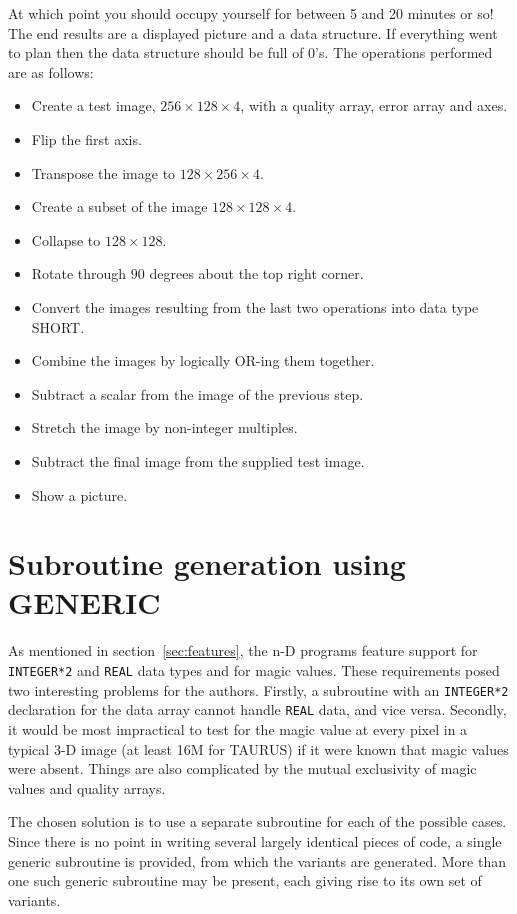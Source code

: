 At which point you should occupy yourself for between 5 and 20 minutes or 
so! The end results are a displayed picture and a data structure. 
If everything went
to plan then the data structure should be full of $0$'s. The operations 
performed are as follows:
\begin{itemize}
\item Create a test image, $256\times 128\times 4$, with a quality array, error
array and axes.
\item Flip the first axis.
\item Transpose the image to $128\times 256\times 4$.
\item Create a subset of the image $128\times 128\times 4$.
\item Collapse to $128\times 128$.
\item Rotate through $90$ degrees about the top right corner.
\item Convert the images resulting from the last two operations into data
type SHORT.
\item Combine the images by logically OR-ing them together.
\item Subtract a scalar from the image of the previous step.
\item Stretch the image by non-integer multiples.
\item Subtract the final image from the supplied test image.
\item Show a picture.
\end{itemize}

\section{Subroutine generation using GENERIC{}}
\label{sec:generic}

As mentioned in section~\ref{sec:features}, the n-D programs feature support for
{\tt INTEGER*2} and {\tt REAL} data types and for magic values. These 
requirements posed two interesting problems for the authors. Firstly, a
subroutine with an {\tt INTEGER*2} declaration for the data array cannot
handle {\tt REAL} data, and vice versa. Secondly, it would be most impractical
to test for the magic value at every pixel in a typical 3-D image (at least 16M
for TAURUS) if it were known that magic values were absent. Things are also
complicated by the mutual exclusivity of magic values and quality arrays.

The chosen solution is to use a separate subroutine for each of the  
possible cases. Since there is no point in writing several largely identical
pieces of code, a single generic subroutine is provided, from which the  
variants are generated. More than one such generic subroutine may be present,
each giving rise to its own set of variants.

